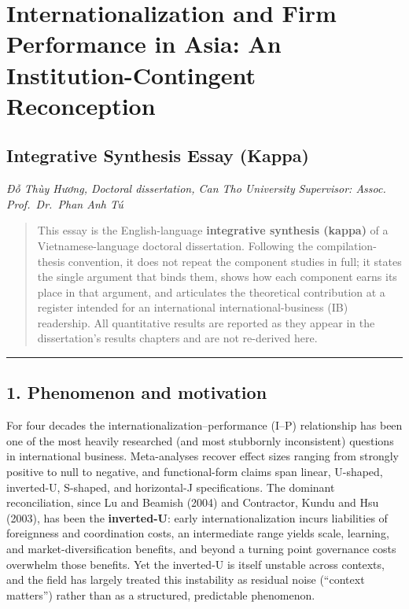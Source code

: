 \documentclass[
  a4paper,
  13pt]{extreport}
\author{}
\date{}
\begin{document}
\hypertarget{internationalization-and-firm-performance-in-asia-an-institution-contingent-reconception}{%
\section{Internationalization and Firm Performance in Asia: An
Institution-Contingent
Reconception}\label{internationalization-and-firm-performance-in-asia-an-institution-contingent-reconception}}

\hypertarget{integrative-synthesis-essay-kappa}{%
\subsection{Integrative Synthesis Essay
(Kappa)}\label{integrative-synthesis-essay-kappa}}

\emph{Đỗ Thùy Hương, Doctoral dissertation, Can Tho University}
\emph{Supervisor: Assoc. Prof.~Dr.~Phan Anh Tú}

\begin{quote}
This essay is the English-language \textbf{integrative synthesis
(kappa)} of a Vietnamese-language doctoral dissertation. Following the
compilation-thesis convention, it does not repeat the component studies
in full; it states the single argument that binds them, shows how each
component earns its place in that argument, and articulates the
theoretical contribution at a register intended for an international
international-business (IB) readership. All quantitative results are
reported as they appear in the dissertation's results chapters and are
not re-derived here.
\end{quote}

\begin{center}\rule{0.5\linewidth}{0.5pt}\end{center}

\hypertarget{phenomenon-and-motivation}{%
\subsection{1. Phenomenon and
motivation}\label{phenomenon-and-motivation}}

For four decades the internationalization--performance (I--P)
relationship has been one of the most heavily researched (and most
stubbornly inconsistent) questions in international business.
Meta-analyses recover effect sizes ranging from strongly positive to
null to negative, and functional-form claims span linear, U-shaped,
inverted-U, S-shaped, and horizontal-J specifications. The dominant
reconciliation, since Lu and Beamish (2004) and Contractor, Kundu and
Hsu (2003), has been the \textbf{inverted-U}: early internationalization
incurs liabilities of foreignness and coordination costs, an
intermediate range yields scale, learning, and market-diversification
benefits, and beyond a turning point governance costs overwhelm those
benefits. Yet the inverted-U is itself unstable across contexts, and the
field has largely treated this instability as residual noise (``context
matters'') rather than as a structured, predictable phenomenon.
\end{document}
